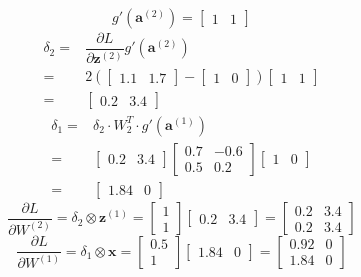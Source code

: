 \documentclass[12pt]{article}
\begin{document}
\begin{enumerate}[font=\Large]
	      $$g'(\mathbf{a}^{(2)})=\begin{bmatrix} 1 & 1 \end{bmatrix}$$
	      $$
		      \begin{aligned}
			      \delta_2= & \dfrac{\partial L}{\partial \textbf{z}^{(2)}} g'(\mathbf{a}^{(2)})                                                 \\
			      =         & 2(\begin{bmatrix} 1.1 & 1.7 \end{bmatrix}-\begin{bmatrix} 1 & 0 \end{bmatrix}) \begin{bmatrix} 1 & 1 \end{bmatrix} \\
			      =         & \begin{bmatrix} 0.2 & 3.4 \end{bmatrix}
		      \end{aligned}$$
	      $$
		      \begin{aligned}
			      \delta_1= & \delta_2\cdot W_2^T\cdot g'(\mathbf{a}^{(1)})                                                                                \\
			      =         & \begin{bmatrix} 0.2 & 3.4 \end{bmatrix}\begin{bmatrix}0.7 & -0.6 \\0.5 & 0.2\end{bmatrix}\begin{bmatrix} 1 & 0 \end{bmatrix} \\
			      =         & \begin{bmatrix} 1.84 & 0 \end{bmatrix}
		      \end{aligned}
	      $$
	      $$\dfrac{\partial L}{\partial W^{(2)}}=\delta_2\otimes\mathbf{z}^{(1)}=\begin{bmatrix} 1 \\ 1 \end{bmatrix}\begin{bmatrix} 0.2 & 3.4 \end{bmatrix}=\begin{bmatrix} 0.2 & 3.4\\ 0.2 & 3.4 \end{bmatrix}$$
	      $$\dfrac{\partial L}{\partial W^{(1)}}=\delta_1\otimes\mathbf{x}=\begin{bmatrix} 0.5 \\ 1 \end{bmatrix}\begin{bmatrix} 1.84 & 0 \end{bmatrix}=\begin{bmatrix} 0.92 & 0\\ 1.84 & 0 \end{bmatrix}$$


\end{enumerate}
\end{document}
